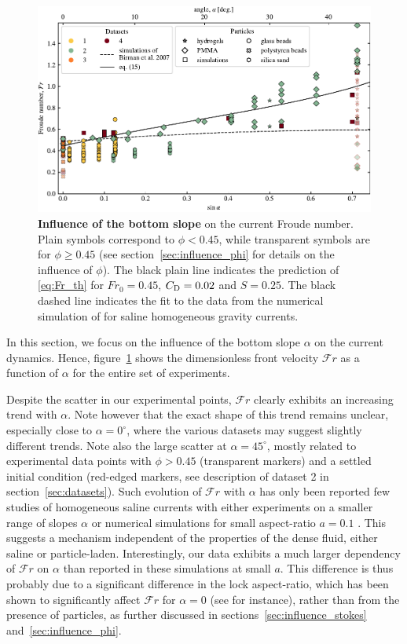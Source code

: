 \documentclass[12pt]{article}
\begin{document}
\begin{figure}
	\centering
	\includegraphics{figure4.pdf}
	\caption{\textbf{Influence of the bottom slope} on the current Froude number. Plain symbols correspond to $\phi < 0.45$, while transparent symbols are for $\phi \geq 0.45$ (see section~\ref{sec:influence_phi} for details on the influence of $\phi$). The black plain line indicates the prediction of \eqref{eq:Fr_th} for $Fr_{0} = 0.45$, $C_{\text D} = 0.02$ and $S = 0.25$. The black dashed line indicates the fit to the data from the numerical simulation of \citet{Birman2007} for saline homogeneous gravity currents.}
	\label{fig:fig4}
\end{figure}

In this section, we focus on the influence of the bottom slope $\alpha$ on the current dynamics. Hence, figure~\ref{fig:fig4} shows the dimensionless front velocity $\mathcal{F}r$ as a function of $\alpha$ for the entire set of experiments.

Despite the scatter in our experimental points, $\mathcal{F}r$ clearly exhibits an increasing trend with $\alpha$. Note however that the exact shape of this trend remains unclear, especially close to $\alpha=0^\circ$, where the various datasets may suggest slightly different trends. Note also the large scatter at $\alpha=45^\circ$, mostly related to experimental data points with $\phi > 0.45$ (transparent markers) and a settled initial condition (red-edged markers, see description of dataset 2 in section~\ref{sec:datasets}).
%
Such evolution of $\mathcal{F}r$ with $\alpha$ has only been reported few studies of homogeneous saline currents with either experiments on a smaller range of slopes $\alpha$ \citep{Maxworthy2007} or numerical simulations for small aspect-ratio $a = 0.1$ \citet{Birman2007}. This suggests a mechanism independent of the properties of the dense fluid, either saline or particle-laden. Interestingly, our data exhibits a much larger dependency of $\mathcal{F}r$ on $\alpha$ than reported in these simulations at small $a$. This difference is thus probably due to a significant difference in the lock aspect-ratio, which has been shown to significantly affect $\mathcal{F}r$ for $\alpha=0$ (see \citet{Bonometti2011} for instance), rather than from the presence of particles, as further discussed in sections~\ref{sec:influence_stokes} and~\ref{sec:influence_phi}.
\end{document}
